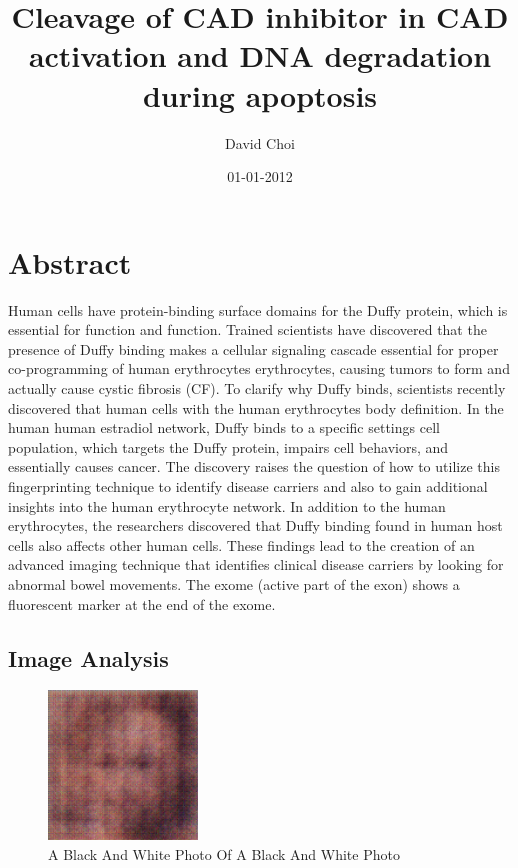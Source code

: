 \documentclass{article}%
\title{Cleavage of CAD inhibitor in CAD activation and DNA degradation during apoptosis}%
\author{David Choi}%
\affil{CAS Key Laboratory of Pathogenic Microbiology and Immunology, Institute of Microbiology, Chinese Academy of Sciences, Beijing, China}%
\date{01{-}01{-}2012}%
\begin{document}
%
\normalsize%
\maketitle%
\section{Abstract}%
\label{sec:Abstract}%
Human cells have protein{-}binding surface domains for the Duffy protein, which is essential for function and function. Trained scientists have discovered that the presence of Duffy binding makes a cellular signaling cascade essential for proper co{-}programming of human erythrocytes erythrocytes, causing tumors to form and actually cause cystic fibrosis (CF). To clarify why Duffy binds, scientists recently discovered that human cells with the human erythrocytes body definition. In the human human estradiol network, Duffy binds to a specific settings cell population, which targets the Duffy protein, impairs cell behaviors, and essentially causes cancer. The discovery raises the question of how to utilize this fingerprinting technique to identify disease carriers and also to gain additional insights into the human erythrocyte network.\newline%
In addition to the human erythrocytes, the researchers discovered that Duffy binding found in human host cells also affects other human cells. These findings lead to the creation of an advanced imaging technique that identifies clinical disease carriers by looking for abnormal bowel movements. The exome (active part of the exon) shows a fluorescent marker at the end of the exome.

%
\subsection{Image Analysis}%
\label{subsec:ImageAnalysis}%


\begin{figure}[h!]%
\centering%
\includegraphics[width=150px]{500_fake_images/samples_5_16.png}%
\caption{A Black And White Photo Of A Black And White Photo}%
\end{figure}

%
\end{document}
